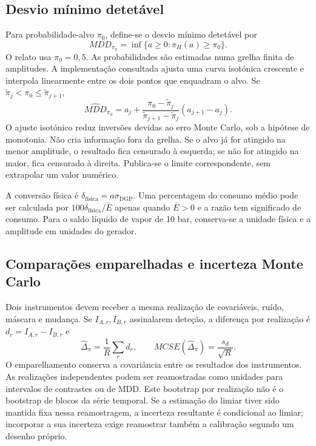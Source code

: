 \subsection{Desvio mínimo detetável}
\label{sec:mat-mdd}
Para probabilidade-alvo $\pi_0$, define-se o desvio mínimo detetável por
\begin{equation}
MDD_{\pi_0}=\inf\{a\geq0:\pi_H(a)\geq\pi_0\}.
\label{eq:mat-mdd}
\end{equation}
O relato usa $\pi_0=0{,}5$. As probabilidades são estimadas numa grelha finita de amplitudes. A implementação consultada ajusta uma curva isotónica crescente e interpola linearmente entre os dois pontos que enquadram o alvo. Se $\widetilde\pi_j<\pi_0\leq\widetilde\pi_{j+1}$,
\begin{equation}
\widehat{MDD}_{\pi_0}=a_j+
\frac{\pi_0-\widetilde\pi_j}{\widetilde\pi_{j+1}-\widetilde\pi_j}(a_{j+1}-a_j).
\label{eq:mat-mdd-interpolacao}
\end{equation}
O ajuste isotónico reduz inversões devidas ao erro Monte Carlo, sob a hipótese de monotonia. Não cria informação fora da grelha. Se o alvo já for atingido na menor amplitude, o resultado fica censurado à esquerda; se não for atingido na maior, fica censurado à direita. Publica-se o limite correspondente, sem extrapolar um valor numérico.

A conversão física é $\delta_{\mathrm{física}}=a\sigma_{\mathrm{DGP}}$. Uma percentagem do consumo médio pode ser calculada por $100\delta_{\mathrm{física}}/\bar E$ apenas quando $\bar E>0$ e a razão tem significado de consumo. Para o saldo líquido de vapor de 10 bar, conserva-se a unidade física e a amplitude em unidades do gerador.

\subsection{Comparações emparelhadas e incerteza Monte Carlo}
\label{sec:mat-mc-emparelhado}
Dois instrumentos devem receber a mesma realização de covariáveis, ruído, máscara e mudança. Se $I_{A,r},I_{B,r}$ assinalarem deteção, a diferença por realização é $d_r=I_{A,r}-I_{B,r}$ e
\begin{equation}
\widehat\Delta_\pi=\frac1R\sum_rd_r,
\qquad MCSE(\widehat\Delta_\pi)=\frac{s_d}{\sqrt R}.
\label{eq:mat-mc-emparelhado}
\end{equation}
O emparelhamento conserva a covariância entre os resultados dos instrumentos. As realizações independentes podem ser reamostradas como unidades para intervalos de contrastes ou de MDD. Este bootstrap por realização não é o bootstrap de blocos da série temporal. Se a estimação do limiar tiver sido mantida fixa nessa reamostragem, a incerteza resultante é condicional ao limiar; incorporar a sua incerteza exige reamostrar também a calibração segundo um desenho próprio.

